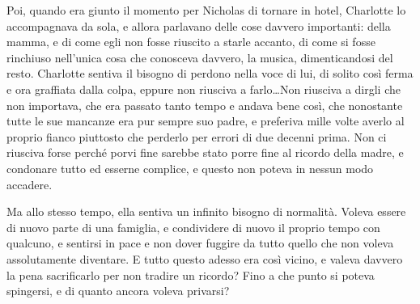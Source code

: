 \documentclass[a4paper,oneside,11pt]{memoir}
\begin{document}
Poi, quando era giunto il momento per Nicholas di tornare in hotel, Charlotte lo accompagnava da
sola, e allora parlavano delle cose davvero importanti: della mamma, e di come egli non fosse
riuscito a starle accanto, di come si fosse rinchiuso nell'unica cosa che conosceva davvero, la
musica, dimenticandosi del resto. Charlotte sentiva il bisogno di perdono nella voce di lui, di
solito così ferma e ora graffiata dalla colpa, eppure non riusciva a farlo\dots Non riusciva a
dirgli che non importava, che era passato tanto tempo e andava bene così, che nonostante tutte le
sue mancanze era pur sempre suo padre, e preferiva mille volte averlo al proprio fianco piuttosto
che perderlo per errori di due decenni prima. Non ci riusciva forse perché porvi fine sarebbe stato
porre fine al ricordo della madre, e condonare tutto ed esserne complice, e questo non poteva in
nessun modo accadere.

Ma allo stesso tempo, ella sentiva un infinito bisogno di normalità. Voleva essere di nuovo parte di
una famiglia, e condividere di nuovo il proprio tempo con qualcuno, e sentirsi in pace e non dover
fuggire da tutto quello che non voleva assolutamente diventare. E tutto questo adesso era così
vicino, e valeva davvero la pena sacrificarlo per non tradire un ricordo? Fino a che punto si
poteva spingersi, e di quanto ancora voleva privarsi?
\end{document}
